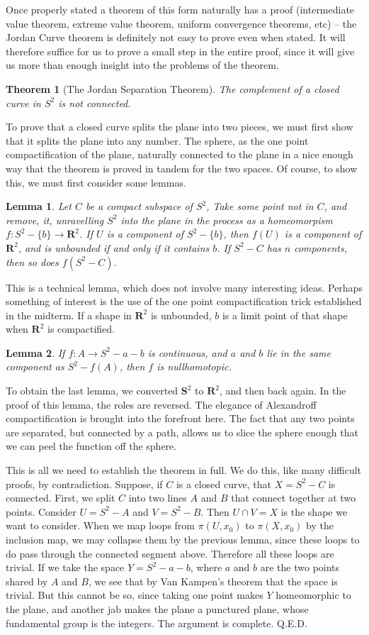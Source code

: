 \documentclass{article}
\newtheorem{theorem}{Theorem}
\newtheorem{lemma}{Lemma}
\begin{document}
Once properly stated a theorem of this form naturally has a proof (intermediate value theorem, extreme value theorem, uniform convergence theorems, etc) -- the Jordan Curve theorem is definitely not easy to prove even when stated. It will therefore suffice for us to prove a small step in the entire proof, since it will give us more than enough insight into the problems of the theorem.
%
\begin{theorem}[The Jordan Separation Theorem]
    The complement of a closed curve in $S^2$ is not connected.
\end{theorem}
%
To prove that a closed curve splits the plane into two pieces, we must first show that it splits the plane into any number. The sphere, as the one point compactification of the plane, naturally connected to the plane in a nice enough way that the theorem is proved in tandem for the two spaces. Of course, to show this, we must first consider some lemmas.
%
\begin{lemma}
    Let $C$ be a compact subspace of $S^2$, Take some point not in $C$, and remove, it, unravelling $S^2$ into the plane in the process as a homeomorpism $f:S^2 - \{b\} \to \mathbf{R}^2$. If $U$ is a component of $S^2 - \{b\}$, then $f(U)$ is a component of $\mathbf{R}^2$, and is unbounded if and only if it contains $b$. If $S^2 - C$ has $n$ components, then so does $f(S^2 - C)$.
\end{lemma}
%
This is a technical lemma, which does not involve many interesting ideas. Perhaps something of interest is the use of the one point compactification trick established in the midterm. If a shape in $\mathbf{R}^2$ is unbounded, $b$ is a limit point of that shape when $\mathbf{R}^2$ is compactified.
%
\begin{lemma}
    If $f:A \to S^2 - a - b$ is continuous, and $a$ and $b$ lie in the same component as $S^2 - f(A)$, then $f$ is nullhomotopic.
\end{lemma}
%
To obtain the last lemma, we converted $\mathbf{S}^2$ to $\mathbf{R}^2$, and then back again. In the proof of this lemma, the roles are reversed. The elegance of Alexandroff compactification is brought into the forefront here. The fact that any two points are separated, but connected by a path, allows us to slice the sphere enough that we can peel the function off the sphere.

This is all we need to establish the theorem in full. We do this, like many difficult proofs, by contradiction. Suppose, if $C$ is a closed curve, that $X = S^2 - C$ is connected. First, we split $C$ into two lines $A$ and $B$ that connect together at two points. Consider $U = S^2 - A$ and $V = S^2 - B$. Then $U \cap V = X$ is the shape we want to consider. When we map loops from $\pi(U,x_0)$ to $\pi(X, x_0)$ by the inclusion map, we may collapse them by the previous lemma, since these loops to do pass through the connected segment above. Therefore all these loops are trivial. If we take the space $Y = S^2 - a - b$, where $a$ and $b$ are the two points shared by $A$ and $B$, we see that by Van Kampen's theorem that the space is trivial. But this cannot be so, since taking one point makes $Y$ homeomorphic to the plane, and another jab makes the plane a punctured plane, whose fundamental group is the integers. The argument is complete. Q.E.D.
\end{document}
